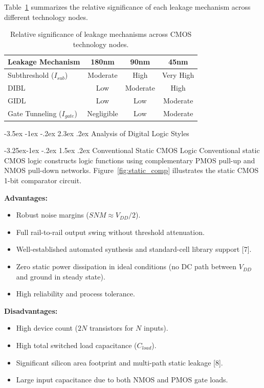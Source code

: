 \documentclass[12pt,a4paper,oneside]{report}
\makeatletter
\renewcommand\section{\@startsection {section}{1}{\z@}%
                                   {-3.5ex \@plus -1ex \@minus -.2ex}%
                                   {2.3ex \@plus.2ex}%
                                   {\normalfont\normalsize\bfseries}}
\renewcommand\subsection{\@startsection{subsection}{2}{\z@}%
                                     {-3.25ex\@plus -1ex \@minus -.2ex}%
                                     {1.5ex \@plus .2ex}%
                                     {\normalfont\normalsize\bfseries\itshape}}
\makeatother
\begin{document}
Table~\ref{tab:leakage_summary} summarizes the relative significance of each leakage mechanism across different technology nodes.

\begin{table}[H]
\centering
\caption{Relative significance of leakage mechanisms across CMOS technology nodes.}
\label{tab:leakage_summary}
\vspace{0.2cm}
\begin{tabular}{|l|c|c|c|}
\hline
\textbf{Leakage Mechanism} & \textbf{180nm} & \textbf{90nm} & \textbf{45nm} \\
\hline
Subthreshold ($I_{sub}$) & Moderate & High & Very High \\
\hline
DIBL & Low & Moderate & High \\
\hline
GIDL & Low & Low & Moderate \\
\hline
Gate Tunneling ($I_{gate}$) & Negligible & Low & Moderate \\
\hline
\end{tabular}
\end{table}

\section{Analysis of Digital Logic Styles}

\subsection{Conventional Static CMOS Logic}
Conventional static CMOS logic constructs logic functions using complementary PMOS pull-up and NMOS pull-down networks. Figure~\ref{fig:static_comp} illustrates the static CMOS 1-bit comparator circuit.

\noindent\textbf{Advantages:}
\begin{itemize}
\item Robust noise margins ($SNM \approx V_{DD}/2$).
\item Full rail-to-rail output swing without threshold attenuation.
\item Well-established automated synthesis and standard-cell library support [7].
\item Zero static power dissipation in ideal conditions (no DC path between $V_{DD}$ and ground in steady state).
\item High reliability and process tolerance.
\end{itemize}

\noindent\textbf{Disadvantages:}
\begin{itemize}
\item High device count ($2N$ transistors for $N$ inputs).
\item High total switched load capacitance ($C_{load}$).
\item Significant silicon area footprint and multi-path static leakage [8].
\item Large input capacitance due to both NMOS and PMOS gate loads.
\end{itemize}
\end{document}
